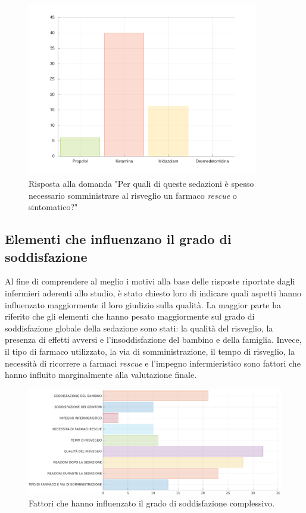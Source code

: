 \begin{figure}[!h]
    \centering
    \includegraphics[width=0.9\textwidth]{Figure/rescue.pdf}
    \caption{Risposta alla domanda "Per quali di queste sedazioni è spesso necessario somministrare al risveglio un farmaco \emph{rescue} o sintomatico?"}
    \label{fig:rescue}
\end{figure}


\subsection*{Elementi che influenzano il grado di soddisfazione}

Al fine di comprendere al meglio i motivi alla base delle risposte riportate dagli infermieri aderenti allo studio, è stato chiesto loro di indicare quali aspetti hanno influenzato maggiormente il loro giudizio sulla qualità. La maggior parte ha riferito che gli elementi che hanno pesato maggiormente sul grado di soddisfazione globale della sedazione sono stati: la qualità del risveglio, la presenza di effetti avversi e l'insoddisfazione del bambino e della famiglia. Invece, il tipo di farmaco utilizzato, la via di somministrazione, il tempo di risveglio, la necessità di ricorrere a farmaci \emph{rescue} e l'impegno infermieristico sono fattori che hanno influito marginalmente alla valutazione finale.

\begin{figure}[!h]
    \centering
    \includegraphics[width=1.1\textwidth]{Figure/soddisfazione-globale.eps}
    \caption{Fattori che hanno influenzato il grado di soddisfazione complessivo.}
    \label{fig:soddglobale}
\end{figure}


